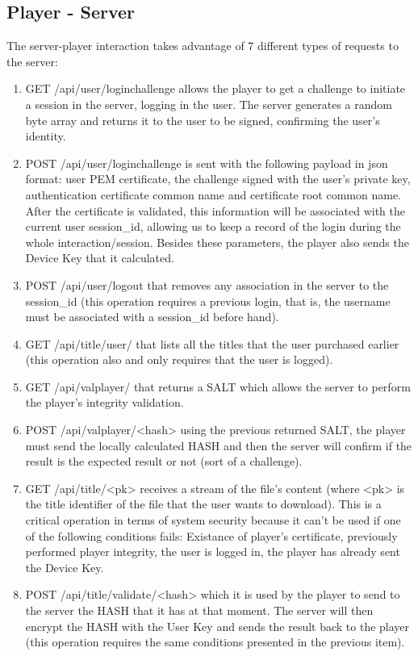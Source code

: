 \documentclass[11pt,a4paper]{report}
\begin{document}
\subsection{Player - Server}
The server-player interaction takes advantage of 7 different types of requests to the server:
\begin{enumerate}
\item GET /api/user/loginchallenge allows the player to get a challenge to initiate a session in the server, logging in the user. The server generates a random byte array and returns it to the user to be signed, confirming the user's identity.
\item POST  /api/user/loginchallenge is sent with the following payload in json format: user PEM certificate, the challenge signed with the user's private key, authentication certificate common name and certificate root common name. 
    After the certificate is validated, this information will be associated with the current user session\_id, allowing us to keep a record of the login during the whole interaction/session. Besides these parameters, the player also sends the Device Key that it calculated.
\item POST  /api/user/logout that removes any association in the server to the session\_id (this operation requires a previous login, that is, the username must be associated with a session\_id before hand).
\item GET   /api/title/user/ that lists all the titles that the user purchased earlier (this operation also and only requires that the user is logged).
\item GET   /api/valplayer/ that returns a SALT which allows the server to perform the player's integrity validation.
\item POST  /api/valplayer/<hash> using the previous returned SALT, the player must send the locally calculated HASH and then the server will confirm if the result is the expected result or not (sort of a challenge).
\item GET   /api/title/<pk> receives a stream of the file's content (where <pk> is the title identifier of the file that the user wants to download). This is a critical operation in terms of system security because it can't be used if one of the following conditions fails: Existance of player's certificate, previously performed player integrity, the user is logged in, the player has already sent the Device Key.
\item POST  /api/title/validate/<hash> which it is used by the player to send to the server the HASH that it has at that moment. The server will then encrypt the HASH with the User Key and sends the result back to the player (this operation requires the same conditions presented in the previous item).
\end{enumerate}
\end{document}
